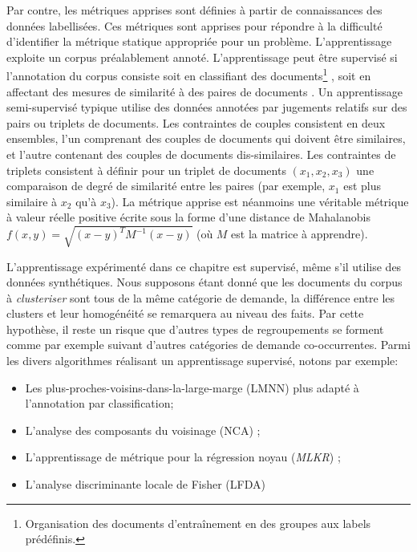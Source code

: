 Par contre, les métriques {apprises} sont définies à partir de connaissances des données labellisées. Ces métriques sont apprises pour répondre à la difficulté d'identifier la métrique statique appropriée pour un problème. L'apprentissage exploite un corpus préalablement annoté. L'apprentissage peut être supervisé si l'annotation du corpus consiste soit en classifiant des documents\footnote{Organisation des documents d'entraînement en des groupes aux labels prédéfinis.} \citep{weinberger2005LMNN}, soit en affectant des mesures de similarité à des paires de documents \citep{bibid}.  Un apprentissage semi-supervisé typique utilise des données annotées par jugements relatifs sur des pairs ou triplets de documents. Les contraintes de couples consistent en deux ensembles, l'un comprenant des couples de documents qui doivent être similaires, et l'autre contenant des couples de documents dis-similaires. Les contraintes de triplets consistent à définir pour un triplet de documents $(x_1,x_2,x_3)$ une comparaison de degré de similarité entre les paires (par exemple, $x_1$ est plus similaire à $x_2$ qu'à $x_3$). La métrique apprise est néanmoins une véritable métrique à valeur réelle positive écrite sous la forme d'une distance de Mahalanobis $f(x,y) = \sqrt{(x-y)^T M^{-1}(x-y)}$ (où $M$ est la matrice à apprendre). 
 
 L'apprentissage expérimenté dans ce chapitre est supervisé, même s'il utilise des données synthétiques. Nous supposons étant donné que les documents du corpus à \textit{clusteriser} sont tous de la même catégorie de demande, la différence entre les clusters et leur homogénéité se remarquera au niveau des faits. Par cette hypothèse, il reste un risque que d'autres types de regroupements se forment comme par exemple suivant d'autres catégories de demande co-occurrentes. Parmi les divers algorithmes réalisant un apprentissage supervisé, notons par exemple:
 \begin{itemize}
 	\item Les plus-proches-voisins-dans-la-large-marge (LMNN) \citep{weinberger2005LMNN} plus adapté à l'annotation par classification;
 	\item L'analyse des composants du voisinage (NCA) \citep{goldberger2005NCA};
 	\item L'apprentissage de métrique pour la régression noyau (\textit{MLKR}) \citep{weinberger2007MLKR};
 	\item L'analyse discriminante locale de Fisher (LFDA) \citep{sugiyama2007LFDA, }
 \end{itemize}


